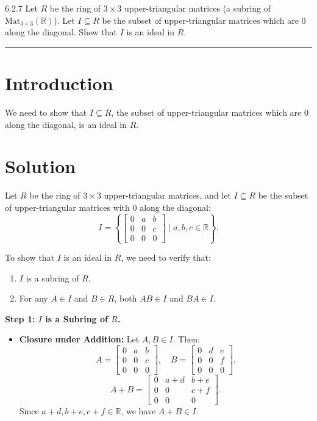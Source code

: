 \documentclass[12pt]{amsart}
\theoremstyle{definition}
\numberwithin{equation}{section}
\newcommand{\R}{\mathbb{R}}
\begin{document}
\newpage
\begin{exercise}{6.2.7} Let \(R\) be the ring of \(3\times 3\) upper-triangular matrices (a subring of \(\text{Mat}_{3 \times 3}(\R)\)). Let \(I\subseteq R\) be the subset of upper-triangular matrices which are 0 along the diagonal. Show that \(I\) is an ideal in \(R\).

    \noindent\rule{\linewidth}{1pt}

    \section*{Introduction}
    We need to show that \(I \subseteq R\), the subset of upper-triangular matrices which are 0 along the diagonal, is an ideal in \(R\).

    \section*{Solution}
    Let \(R\) be the ring of \(3 \times 3\) upper-triangular matrices, and let \(I \subseteq R\) be the subset of upper-triangular matrices with 0 along the diagonal:
    \[
    I = \left \{ \begin{bmatrix} 0 & a & b \\ 0 & 0 & c \\ 0 & 0 & 0 \end{bmatrix} \mid a, b, c \in \R \right \}.
    \]

    To show that \(I\) is an ideal in \(R\), we need to verify that:
    \begin{enumerate}[label=\textbf{\arabic*.}]
        \item \(I\) is a subring of \(R\).
        \item For any \(A \in I\) and \(B \in R\), both \(AB \in I\) and \(BA \in I\).
    \end{enumerate}

    \noindent \textbf{Step 1: \(I\) is a Subring of \(R\).}

    \begin{itemize}
        \item \textbf{Closure under Addition:}
        Let \(A, B \in I\). Then:
        \[
        A = \begin{bmatrix} 0 & a & b \\ 0 & 0 & c \\ 0 & 0 & 0 \end{bmatrix}, \quad B = \begin{bmatrix} 0 & d & e \\ 0 & 0 & f \\ 0 & 0 & 0 \end{bmatrix}.
        \]
        \[
        A + B = \begin{bmatrix} 0 & a+d & b+e \\ 0 & 0 & c+f \\ 0 & 0 & 0 \end{bmatrix}.
        \]
        Since \(a+d, b+e, c+f \in \R \), we have \(A + B \in I\).


\end{itemize}
\end{exercise}
\end{document}
